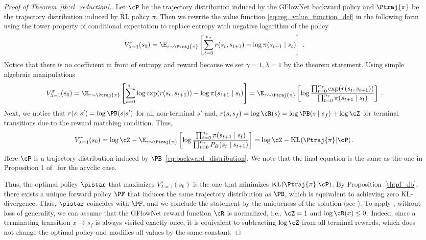 \begin{proof}[Proof of Theorem~\ref{th:rl_reduction}.]
Let $\cP$ be the trajectory distribution induced by the GFlowNet backward policy and $\Ptraj{\pi}$ be the trajectory distribution induced by RL policy $\pi$. Then we rewrite the value function \eqref{eq:reg_value_function_def} in the following form using the tower property of conditional expectation to replace entropy with negative logarithm of the policy
$$
    V^{\pi}_{\lambda=1}(s_0) = \E_{\tau \sim \Ptraj{\pi}} \left[ \sum_{t = 0}^{n_\tau} r(s_t, s_{t + 1}) - \log \pi(s_{t+1} \mid s_t) \right]\,.
$$
Notice that there is no coefficient in front of entropy and reward because we set $\gamma = 1, \lambda=1$ by the theorem statement. Using simple algebraic manipulations
$$
    V^{\pi}_{\lambda=1}(s_0) = \E_{\tau \sim \Ptraj{\pi}} \left[ \sum_{t = 0}^{n_\tau} \log\exp(r(s_t, s_{t + 1})) - \log \pi(s_{t + 1} \mid s_t)\right] = \E_{\tau \sim \Ptraj{\pi}} \left[ \log  \frac{\prod_{t = 0}^{n_\tau} \exp (r(s_t, s_{t + 1}))}{\prod_{t = 0}^{n_\tau} \pi(s_{t + 1} \mid s_t)}\right]\,.
$$
Next, we notice that $r(s,s') = \log \PB(s|s')$ for all non-terminal $s'$ and, $r(s,s_f) = \log \cR(s) = \log \PB(s \mid s_f) + \log \cZ$ for terminal transitions due to the reward matching condition. Thus,
\[
    V^{\pi}_{\lambda=1}(s_0)  = \log \cZ -\E_{\tau \sim \Ptraj{\pi}} \left[ \log  \frac{\prod_{t = 0}^{n_\tau} \pi(s_{t + 1} \mid s_t)}{\prod_{t = 0}^{n_\tau} P_B(s_t \mid s_{t + 1})}\right] = \log \cZ -\operatorname{KL}(\Ptraj{\pi} \vert \cP)\,.
\]
Here $\cP$ is a trajectory distribution induced by $\PB$~\eqref{eq:backward_distribution}. We note that the final equation is the same as the one in Proposition 1 of~\cite{tiapkin2024generative} for the acyclic case.

Thus, the optimal policy $\pistar$ that maximizes $V^{\pi}_{\lambda=1}(s_0)$ is the one that minimizes $\operatorname{KL}(\Ptraj{\pi} \vert \cP)$. By Proposition~\ref{th:pf_db}, there exists a unique forward policy $\PF$ that induces the same trajectory distribution as $\PB$, which is equivalent to achieving zero KL-divergence. Thus, $\pistar$ coincides with $\PF$, and we conclude the statement by the uniqueness of the solution (see ). To apply , without loss of generality, we can assume that the GFlowNet reward function $\cR$ is normalized, i.e., $\cZ = 1$ and $\log \cR(x) \leq 0$. Indeed, since a terminating transition $x \to s_f$ is always visited exactly once, it is equivalent to subtracting $\log \cZ$ from all terminal rewards, which does not change the optimal policy and modifies all values by the same constant.


\end{proof}

